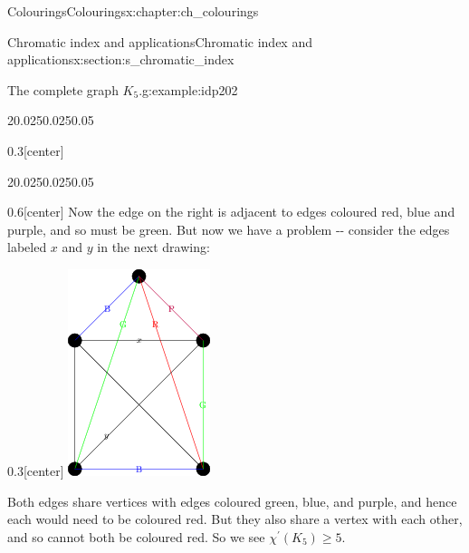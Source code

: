\documentclass[oneside,10pt,]{book}
\numberwithin{equation}{section}
\begin{document}
\begin{chapterptx}{Colourings}{}{Colourings}{}{}{x:chapter:ch_colourings}
\begin{sectionptx}{Chromatic index and applications}{}{Chromatic index and applications}{}{}{x:section:s_chromatic_index}
\begin{example}{The complete graph \(K_5\).}{g:example:idp202}
\begin{sidebyside}{2}{0.025}{0.025}{0.05}
\begin{sbspanel}{0.3}[center]
\end{sbspanel}%
\end{sidebyside}%
\begin{sidebyside}{2}{0.025}{0.025}{0.05}%
\begin{sbspanel}{0.6}[center]%
Now the edge on the right is adjacent to edges coloured red, blue and purple, and so must be green.  But now we have a problem -{}-{} consider the edges labeled \(x\) and \(y\) in the next drawing:%
\end{sbspanel}%
\begin{sbspanel}{0.3}[center]%
\includegraphics[width=\linewidth]{images/K5EdgeColouring2.png}
\end{sbspanel}%
\end{sidebyside}%
Both edges share vertices with edges coloured green, blue, and purple, and hence each would need to be coloured red.  But they also share a vertex with each other, and so cannot both be coloured red.  So we see \(\chi^\prime(K_5)\geq 5\).%

\end{example}
\end{sectionptx}
\end{chapterptx}
\end{document}
